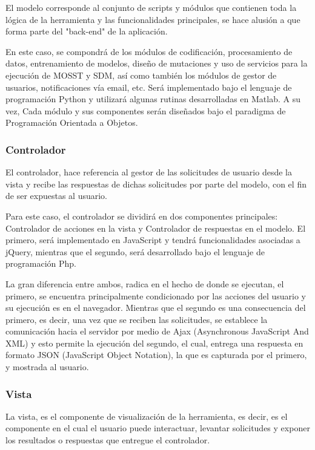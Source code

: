 El modelo corresponde al conjunto de scripts y módulos que contienen toda la lógica de la herramienta y las funcionalidades principales, se hace alusión a que forma parte del "back-end" de la aplicación. 

En este caso, se compondrá de los módulos de codificación, procesamiento de datos, entrenamiento de modelos, diseño de mutaciones y uso de servicios para la ejecución de MOSST y SDM, así como también los módulos de gestor de usuarios, notificaciones vía email, etc. Será implementado bajo el lenguaje de programación Python y utilizará algunas rutinas desarrolladas en Matlab. A su vez, Cada módulo y sus componentes serán diseñados bajo el paradigma de Programación Orientada a Objetos.

\subsubsection{Controlador}

El controlador, hace referencia al gestor de las solicitudes de usuario desde la vista y recibe las respuestas de dichas solicitudes por parte del modelo, con el fin de ser expuestas al usuario. 

Para este caso, el controlador se dividirá en dos componentes principales: Controlador de acciones en la vista y Controlador de respuestas en el modelo. El primero, será implementado en JavaScript y tendrá funcionalidades asociadas a jQuery, mientras que el segundo, será desarrollado bajo el lenguaje de programación Php. 

La gran diferencia entre ambos, radica en el hecho de donde se ejecutan, el primero, se encuentra principalmente condicionado por las acciones del usuario y su ejecución es en el navegador. Mientras que el segundo es una consecuencia del primero, es decir, una vez que se reciben las solicitudes, se establece la comunicación hacia el servidor por medio de Ajax (Asynchronous JavaScript And XML) y esto permite la ejecución del segundo, el cual, entrega una respuesta en formato JSON (JavaScript Object Notation), la que es capturada por el primero, y mostrada al usuario.

\subsubsection{Vista}

La vista, es el componente de visualización de la herramienta, es decir, es el componente en el cual el usuario puede interactuar, levantar solicitudes y exponer los resultados o respuestas que entregue el controlador.

